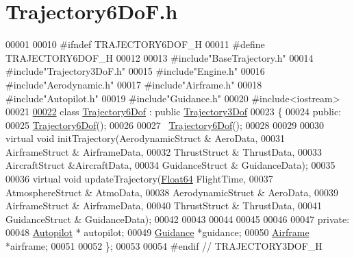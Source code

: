 \hypertarget{_trajectory6_do_f_8h_source}{}\section{Trajectory6\+Do\+F.\+h}
\label{_trajectory6_do_f_8h_source}

\begin{DoxyCode}
00001 
00010 \textcolor{preprocessor}{#ifndef TRAJECTORY6DOF\_H}
00011 \textcolor{preprocessor}{#define TRAJECTORY6DOF\_H}
00012 
00013 \textcolor{preprocessor}{#include"BaseTrajectory.h"}
00014 \textcolor{preprocessor}{#include"Trajectory3DoF.h"}
00015 \textcolor{preprocessor}{#include"Engine.h"}
00016 \textcolor{preprocessor}{#include"Aerodynamic.h"}
00017 \textcolor{preprocessor}{#include"Airframe.h"}
00018 \textcolor{preprocessor}{#include"Autopilot.h"}
00019 \textcolor{preprocessor}{#include"Guidance.h"}
00020 \textcolor{preprocessor}{#include<iostream>}
00021 
\hyperlink{group___trajectory}{00022} \textcolor{keyword}{class }\hyperlink{group___trajectory_class_trajectory6_dof}{Trajectory6Dof} : \textcolor{keyword}{public} \hyperlink{group___trajectory_class_trajectory3_dof}{Trajectory3Dof}
00023 \{
00024 \textcolor{keyword}{public}:
00025     \hyperlink{group___trajectory_class_trajectory6_dof}{Trajectory6Dof}();
00026 
00027     ~\hyperlink{group___trajectory_class_trajectory6_dof}{Trajectory6Dof}();
00028 
00029     
00030     \textcolor{keyword}{virtual} \textcolor{keywordtype}{void} initTrajectory(AerodynamicStruct & AeroData,
00031                                 AirframeStruct & AirframeData,
00032                                 ThrustStruct & ThrustData,
00033                                 AircraftStruct &AircraftData,
00034                                 GuidanceStruct & GuidanceData);
00035     
00036     \textcolor{keyword}{virtual} \textcolor{keywordtype}{void} updateTrajectory(\hyperlink{group___tools_ga3f1431cb9f76da10f59246d1d743dc2c}{Float64} FlightTime,
00037                         AtmosphereStruct & AtmoData,
00038                         AerodynamicStruct & AeroData,
00039                         AirframeStruct & AirframeData,
00040                         ThrustStruct & ThrustData,
00041                         GuidanceStruct & GuidanceData);
00042 
00043 
00044 
00045 
00046 
00047 \textcolor{keyword}{private}:
00048     \hyperlink{class_autopilot}{Autopilot} * autopilot;
00049     \hyperlink{class_guidance}{Guidance}  *guidance;
00050     \hyperlink{group___airframe_class_airframe}{Airframe}     *airframe;
00051     
00052 \};
00053 
00054 \textcolor{preprocessor}{#endif // TRAJECTORY3DOF\_H}
\end{DoxyCode}
